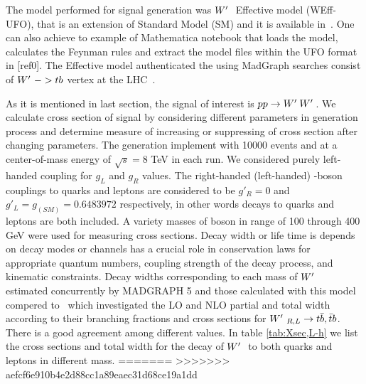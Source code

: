  The model performed for signal generation was $W^\prime~$ Effective model {\small (WEff-UFO)}, that is an extension of Standard Model {\small (SM)} and it is available in~\cite{Duffty:2012rf,Sullivan:2002jt}. One can also achieve to example of Mathematica notebook that loads the model, calculates the Feynman rules and extract the model files within the UFO format in [ref0]. The \wprime Effective model authenticated the using MadGraph searches consist of $W^\prime~ -> tb$ vertex at the LHC~\cite{ATLAS-CONF-2013-050}.
 
  As it is mentioned in last section, the signal of interest is $ pp\rightarrow {\tiny \ensuremath{W^\prime}~\ensuremath{W^\prime}~} $. We calculate cross section of signal by considering different parameters in generation process and determine measure of increasing or suppressing of cross section after changing parameters. The generation implement with 10000 events and at a center-of-mass energy of $ \sqrt{s}=8 $ TeV in each run. We considered purely left-handed coupling  for $ g_L $ and $ g_R $ values. The right-handed (left-handed) \wprime-boson couplings to quarks and leptons are considered to be $g'_R = 0$ and $g'_L = g_{(SM)}=0.6483972$ respectively, in other words decays to quarks and leptons are both included. A variety masses of \wprime boson in range of 100 through 400 GeV were used for measuring cross sections.  Decay width or life time is depends on decay modes or channels has a crucial role in conservation laws for appropriate quantum numbers, coupling strength of the decay process, and kinematic constraints. Decay widths corresponding to each mass of $ W^\prime~ $ estimated concurrently by {\small MADGRAPH 5} and those calculated with this model compered to~\cite{Sullivan:2002jt} which investigated the LO and NLO partial and total width according to their branching fractions and cross sections for  $ W^\prime~_{R,L}\rightarrow t \bar{b},\bar{t}b $.  There is a good agreement among different values.  In table \ref{tab:Xsec,L-h} we list the cross sections and total width for the decay of $ W^\prime~ $ to both quarks and leptons in different mass. 
=======
>>>>>>> aefcf6e910b4e2d88cc1a89eaec31d68ce19a1dd

